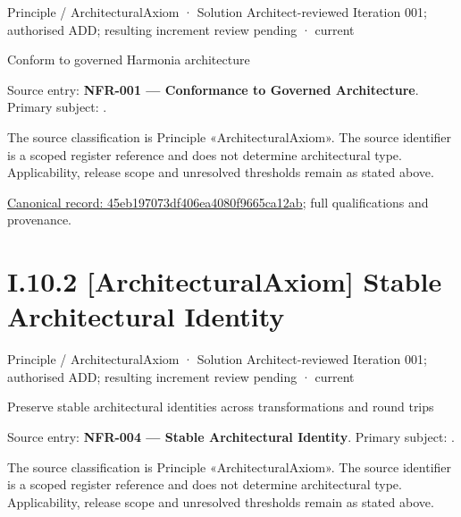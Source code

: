\label{element:45eb197073df406ea4080f9665ca12ab}
{\small Principle / ArchitecturalAxiom · Solution Architect-reviewed Iteration 001; authorised ADD; resulting increment review pending · current}\par

Conform to governed Harmonia architecture



Source entry: \textbf{NFR-001 — Conformance to Governed Architecture}. Primary subject: \texttt{}.



The source classification is Principle «ArchitecturalAxiom». The source identifier is a scoped register reference and does not determine architectural type. Applicability, release scope and unresolved thresholds remain as stated above.


{\footnotesize \href{../../../../../../../continuum/motivation/principle/architectural-axiom/45eb197073df406ea4080f9665ca12ab.md}{Canonical record: 45eb197073df406ea4080f9665ca12ab}; full qualifications and provenance.}\par
\section*{I.10.2 [ArchitecturalAxiom] Stable Architectural Identity}
\label{navigation:I.10.2}

\label{element:86ecebbf65fc46af9763c96840342823}
{\small Principle / ArchitecturalAxiom · Solution Architect-reviewed Iteration 001; authorised ADD; resulting increment review pending · current}\par

Preserve stable architectural identities across transformations and round trips



Source entry: \textbf{NFR-004 — Stable Architectural Identity}. Primary subject: \texttt{}.



The source classification is Principle «ArchitecturalAxiom». The source identifier is a scoped register reference and does not determine architectural type. Applicability, release scope and unresolved thresholds remain as stated above.


